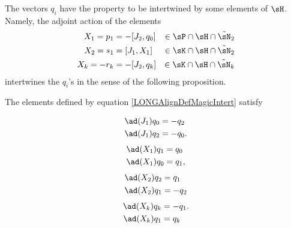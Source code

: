 The vectors $q_i$ have the property to be intertwined by some elements of $\sH$. Namely, the adjoint action of the elements
%
\begin{subequations}\label{LONGAlignDefMagicIntert}
	\begin{align}
		X_1=p_1  & =-[J_2,q_0] & \in\sP\cap\sH\cap\tilde\sN_2                             \\
		X_2=s_1  & =[J_1,X_1]  & \in\sK\cap\sH\cap\tilde\sN_2                             \\
		X_k=-r_k & =-[J_2,q_k] & \in\sK\cap\sH\cap\tilde\sN_k				\label{LONGEqDefXkCommeComm}
	\end{align}
\end{subequations}%
%
intertwines the $q_i$'s in the sense of the following proposition.
%
\begin{proposition}			\label{LONGXUnALaTwistingSuperCool}
	The elements defined by equation \eqref{LONGAlignDefMagicIntert} satisfy
	\begin{multicols}{2}
		\begin{subequations}				\label{LONGEqCalculBBBJUnUnNirme}
			\begin{align}
				\ad(J_1)q_0 & =-q_2		\label{LONGEqCalculBBBJUnUnNirmeA}  \\
				\ad(J_1)q_2 & =-q_0.		\label{LONGEqCalculBBBJUnUnNirmeB}
			\end{align}
		\end{subequations}
		\begin{subequations}				\label{LONGEqSubEqbXUnqZero}
			\begin{align}
				\ad(X_1)q_1 & =q_0		\label{LONGSubEqbXZeroqUn}  \\
				\ad(X_1)q_0 & =q_1,		\label{LONGSubEqbXUnqZero}
			\end{align}
		\end{subequations}
		\begin{subequations}
			\begin{align}
				\ad(X_2)q_2 & =q_1		\label{LONGSubEqXdeuxQdeuxa} \\
				\ad(X_2)q_1 & =-q_2		\label{LONGSubEqXdeuxQun}
			\end{align}
		\end{subequations}
		\begin{subequations}				\label{LONGEqSubEqbXkqZero}
			\begin{align}
				\ad(X_k)q_k & =-q_1.		\label{LONGSubEqbXIMoinsqZero} \\
				\ad(X_k)q_1 & =q_k		\label{LONGSubEqbXkQunQk}
			\end{align}
		\end{subequations}
	\end{multicols}
\end{proposition}



